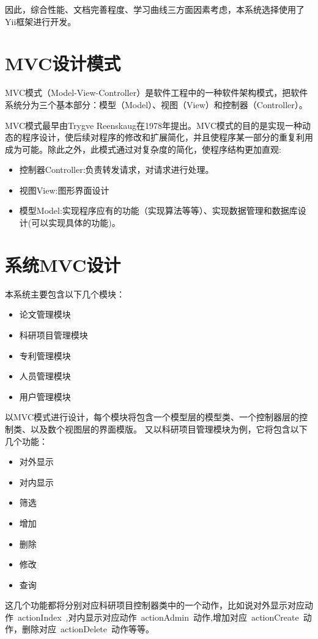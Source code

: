 因此，综合性能\cite{yiiperf}、文档完善程度\cite{makarov2011yii}、学习曲线三方面因素考虑，本系统选择使用了Yii框架进行开发。

\section{MVC设计模式}
MVC模式（Model-View-Controller）是软件工程中的一种软件架构模式，把软件系统分为三个基本部分：模型（Model）、视图（View）和控制器（Controller）。

MVC模式最早由Trygve Reenskaug在1978年提出。MVC模式的目的是实现一种动态的程序设计，使后续对程序的修改和扩展简化，并且使程序某一部分的重复利用成为可能。除此之外，此模式通过对复杂度的简化，使程序结构更加直观:
\begin{itemize}
\item 控制器Controller:负责转发请求，对请求进行处理。
\item 视图View:图形界面设计
\item 模型Model:实现程序应有的功能（实现算法等等）、实现数据管理和数据库设计(可以实现具体的功能)。
\end{itemize}


\section{系统MVC设计}
本系统主要包含以下几个模块：
\begin{itemize}
\item 论文管理模块
\item 科研项目管理模块
\item 专利管理模块
\item 人员管理模块
\item 用户管理模块
\end{itemize}

以MVC模式进行设计，每个模块将包含一个模型层的模型类、一个控制器层的控制类、以及数个视图层的界面模版。
又以科研项目管理模块为例，它将包含以下几个功能：

\begin{itemize}
\item 对外显示
\item 对内显示
\item 筛选
\item 增加
\item 删除
\item 修改
\item 查询
\end{itemize}
这几个功能都将分别对应科研项目控制器类中的一个动作，比如说对外显示对应动作~actionIndex~,对内显示对应动作~actionAdmin~动作,增加对应~actionCreate~动作，删除对应~actionDelete~动作等等。

